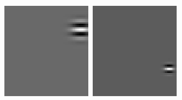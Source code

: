 \begin{figure}[ht]
\begin{center}
\includegraphics[width=\textwidth/9]{ch4/figures/Gabor1.png}
\includegraphics[width=\textwidth/9]{ch4/figures/Gabor2.png}

\end{center}
\end{figure}
